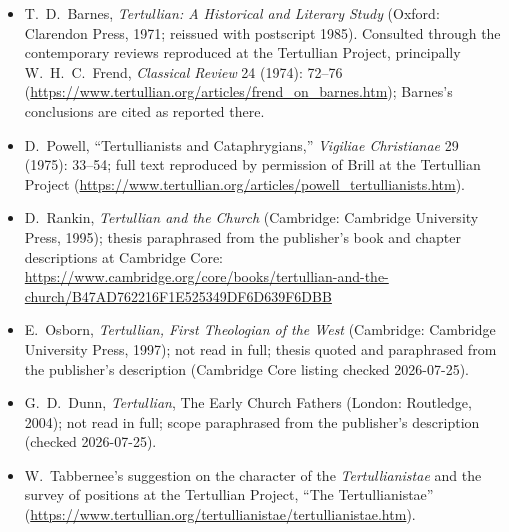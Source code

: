 \begin{itemize}
\item T.~D.~Barnes, \textit{Tertullian: A Historical and Literary Study}
(Oxford: Clarendon Press, 1971; reissued with postscript 1985). Consulted
through the contemporary reviews reproduced at the Tertullian Project,
principally W.~H.~C.~Frend, \textit{Classical Review} 24 (1974): 72--76
(\url{https://www.tertullian.org/articles/frend_on_barnes.htm}); Barnes's
conclusions are cited as reported there.
\item D.~Powell, ``Tertullianists and Cataphrygians,'' \textit{Vigiliae
Christianae} 29 (1975): 33--54; full text reproduced by permission of Brill
at the Tertullian Project
(\url{https://www.tertullian.org/articles/powell_tertullianists.htm}).
\item D.~Rankin, \textit{Tertullian and the Church} (Cambridge: Cambridge
University Press, 1995); thesis paraphrased from the publisher's book and
chapter descriptions at Cambridge Core:
\url{https://www.cambridge.org/core/books/tertullian-and-the-church/B47AD762216F1E525349DF6D639F6DBB}
\item E.~Osborn, \textit{Tertullian, First Theologian of the West}
(Cambridge: Cambridge University Press, 1997); not read in full; thesis
quoted and paraphrased from the publisher's description (Cambridge Core
listing checked 2026-07-25).
\item G.~D.~Dunn, \textit{Tertullian}, The Early Church Fathers (London:
Routledge, 2004); not read in full; scope paraphrased from the publisher's
description (checked 2026-07-25).
\item W.~Tabbernee's suggestion on the character of the
\textit{Tertullianistae} and the survey of positions at the Tertullian
Project, ``The Tertullianistae''
(\url{https://www.tertullian.org/tertullianistae/tertullianistae.htm}).
\end{itemize}
